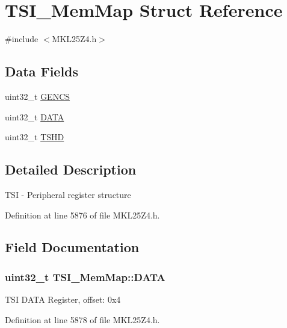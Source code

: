 \hypertarget{struct_t_s_i___mem_map}{}\section{T\+S\+I\+\_\+\+Mem\+Map Struct Reference}
\label{struct_t_s_i___mem_map}


{\ttfamily \#include $<$M\+K\+L25\+Z4.\+h$>$}

\subsection*{Data Fields}
\begin{DoxyCompactItemize}
\item 
uint32\+\_\+t \hyperlink{struct_t_s_i___mem_map_a14380d508e161af3b794962e7c3f8abb}{G\+E\+N\+CS}
\item 
uint32\+\_\+t \hyperlink{struct_t_s_i___mem_map_af21190d34aa787d4660144470b71ad90}{D\+A\+TA}
\item 
uint32\+\_\+t \hyperlink{struct_t_s_i___mem_map_aeede6a8023aabcd9c6fff71419ae4cce}{T\+S\+HD}
\end{DoxyCompactItemize}


\subsection{Detailed Description}
T\+SI -\/ Peripheral register structure 

Definition at line 5876 of file M\+K\+L25\+Z4.\+h.



\subsection{Field Documentation}
\subsubsection[{\texorpdfstring{D\+A\+TA}{DATA}}]{\setlength{\rightskip}{0pt plus 5cm}uint32\+\_\+t T\+S\+I\+\_\+\+Mem\+Map\+::\+D\+A\+TA}\hypertarget{struct_t_s_i___mem_map_af21190d34aa787d4660144470b71ad90}{}\label{struct_t_s_i___mem_map_af21190d34aa787d4660144470b71ad90}
T\+SI D\+A\+TA Register, offset\+: 0x4 

Definition at line 5878 of file M\+K\+L25\+Z4.\+h.

